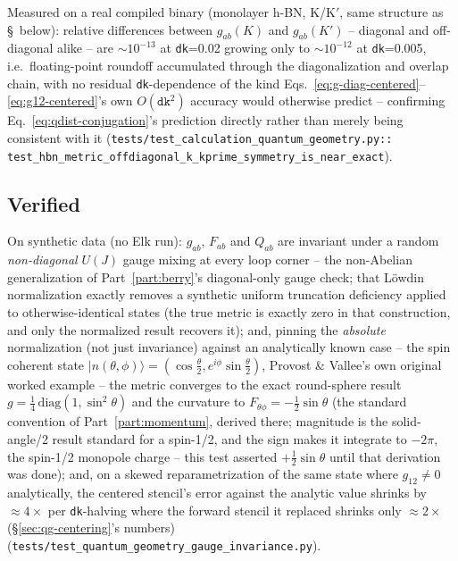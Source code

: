\documentclass[11pt]{article}
\begin{document}
Measured on a real compiled binary (monolayer h-BN, K/K$'$, same structure as \S~below):
relative differences between $g_{ab}(K)$ and $g_{ab}(K')$ -- diagonal and off-diagonal
alike -- are $\sim10^{-13}$ at \texttt{dk}=0.02 growing only to $\sim10^{-12}$ at
\texttt{dk}=0.005, i.e.\ floating-point roundoff accumulated through the diagonalization
and overlap chain, with no residual \texttt{dk}-dependence of the kind
Eqs.~\eqref{eq:g-diag-centered}--\eqref{eq:g12-centered}'s own $O(\texttt{dk}^2)$
accuracy would otherwise predict -- confirming Eq.~\eqref{eq:qdist-conjugation}'s
prediction directly rather than merely being consistent with it
(\texttt{tests/test\_calculation\_quantum\_geometry.py::
test\_hbn\_metric\_offdiagonal\_k\_kprime\_symmetry\_is\_near\_exact}).

\subsection{Verified}

On synthetic data (no Elk run): $g_{ab}$, $F_{ab}$ and $Q_{ab}$ are invariant under a
random \emph{non-diagonal} $U(J)$ gauge mixing at every loop corner -- the non-Abelian
generalization of Part~\ref{part:berry}'s diagonal-only gauge check; that Löwdin
normalization exactly removes a synthetic uniform truncation deficiency applied to
otherwise-identical states (the true metric is exactly zero in that construction, and
only the normalized result recovers it); and, pinning the \emph{absolute} normalization
(not just invariance) against an analytically known case -- the spin coherent state
$|n(\theta,\phi)\rangle = (\cos\tfrac\theta2, e^{i\phi}\sin\tfrac\theta2)$, Provost \&
Vallee's own original worked example -- the metric converges to the exact round-sphere
result $g = \tfrac14\,\mathrm{diag}(1,\sin^2\theta)$ and the curvature to
$F_{\theta\phi}=-\tfrac12\sin\theta$ (the standard convention of
Part~\ref{part:momentum}, derived there; magnitude is the solid-angle/2 result standard
for a spin-1/2, and the sign makes it integrate to $-2\pi$, the spin-1/2 monopole
charge -- this test asserted $+\tfrac12\sin\theta$ until that derivation was done); and, on a
skewed reparametrization of the same state where $g_{12}\ne0$ analytically, the centered
stencil's error against the analytic value shrinks by $\approx4\times$ per
\texttt{dk}-halving where the forward stencil it replaced shrinks only $\approx2\times$
(\S\ref{sec:qg-centering}'s numbers)
(\texttt{tests/test\_quantum\_geometry\_gauge\_invariance.py}).
\end{document}
